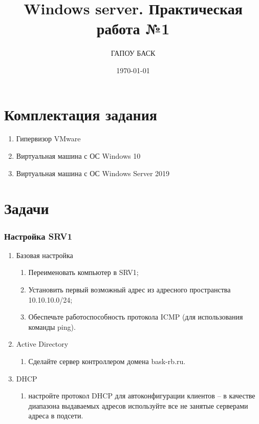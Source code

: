 \documentclass[a4paper, 12pt]{report}
\author{ГАПОУ БАСК}
\title{Windows server. Практическая работа №1}
\date{\today}
\begin{document}
	
	\maketitle
	\clearpage

	\section{Комплектация задания}

	\begin{enumerate}
		\item Гипервизор VMware
		\item Виртуальная машина с ОС Windows 10
		\item Виртуальная машина с ОС Windows Server 2019
	\end{enumerate}

	\section{Задачи}
	
	\subsubsection{Настройка SRV1}
	
	\begin{enumerate}
		\item Базовая настройка
		\begin{enumerate}
			\item Переименовать компьютер в SRV1;
			\item Установить первый возможный адрес из адресного пространства 10.10.10.0/24;
			\item Обеспечьте работоспособность протокола ICMP (для использования команды ping).
		\end{enumerate}
		\item Active Directory
		\begin{enumerate}
			\item Сделайте сервер контроллером домена bask-rb.ru.
		\end{enumerate}
		\item DHCP
		\begin{enumerate}
			\item настройте протокол DHCP для автоконфигурации клиентов – в качестве диапазона выдаваемых адресов используйте все не занятые серверами адреса в подсети.
		\end{enumerate}
	\end{enumerate}
\end{document}
